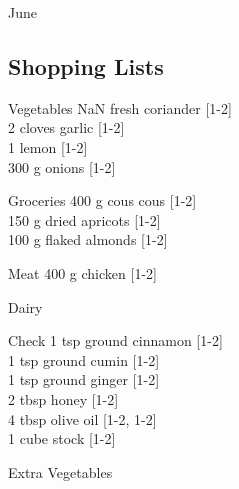 \begin{menu}{June}
    \subsection*{Shopping Lists}
      \begin{shoppinglist}{Vegetables}
      NaN  fresh coriander 
        {\scriptsize[1-2]}\\
      2 cloves garlic 
        {\scriptsize[1-2]}\\
      1  lemon 
        {\scriptsize[1-2]}\\
      300 g onions 
        {\scriptsize[1-2]}\\
      \end{shoppinglist}%
      \begin{shoppinglist}{Groceries}
      400 g cous cous 
        {\scriptsize[1-2]}\\
      150 g dried apricots 
        {\scriptsize[1-2]}\\
      100 g flaked almonds 
        {\scriptsize[1-2]}\\
      \end{shoppinglist}%
      \par\vfil %
      \begin{shoppinglist}{Meat}
      400 g chicken 
        {\scriptsize[1-2]}\\
      \end{shoppinglist}%
      \begin{shoppinglist}{Dairy}
      \end{shoppinglist}%
      \par\vfil %
      \vfil\clearpage %
      \begin{shoppinglist}{Check}
      1 tsp ground cinnamon 
        {\scriptsize[1-2]}\\
      1 tsp ground cumin 
        {\scriptsize[1-2]}\\
      1 tsp ground ginger 
        {\scriptsize[1-2]}\\
      2 tbsp honey 
        {\scriptsize[1-2]}\\
      4 tbsp olive oil 
        {\scriptsize[1-2, 1-2]}\\
      1 cube stock 
        {\scriptsize[1-2]}\\
      \end{shoppinglist}%
      \begin{shoppinglist}{Extra Vegetables}
      \end{shoppinglist}%
      \par\vfil %
    \vfil\clearpage
  

\end{menu}
